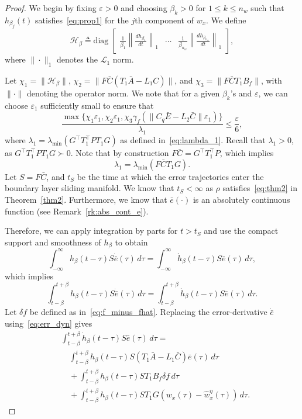 \documentclass[times, doublespace]{rncauth}
\newcommand{\intinf}{\int_{-\infty}^{\infty}}
\newcommand{\intinfb}{\int_{t-\beta}^{t+\beta}}
\begin{document}
\begin{proof}
	We begin by fixing $\varepsilon>0$ and choosing $\beta_k>0$ for $1\le k\le n_w$ such that $h_{\beta_j}(t)$ satisfies~\eqref{eq:prop1} for the $j$th component of $w_x$. We define
	\begin{equation}\label{eq:pf2d}
	\mathcal H_\beta \triangleq \mathrm{diag}\;\begin{bmatrix}
	\frac{1}{\beta_1}\left\|\frac{dh_{\beta_1}}{dt}\right\|_1 & \cdots & \frac{1}{\beta_{n_w}}\left\|\frac{dh_{\beta_{n_w}}}{dt}\right\|_1
	\end{bmatrix},
	\end{equation}
	where $\|\cdot\|_1$ denotes the $\mathcal L_1$ norm.
	
	Let $\chi_1 = \|\mathcal H_\beta\|$, $\chi_2 = \|F\bar C(T_1 \bar A-L_1 C)\|$, and $\chi_3 = \|F\bar CT_1 B_f\|$, with $\|\cdot\|$ denoting the operator norm. We note that for a given $\beta_k$'s and $\varepsilon$, we can choose $\varepsilon_1$ sufficiently small to ensure that
	\begin{equation}\label{eq:chi}
	\frac{\max\{\chi_1 \varepsilon_1, \chi_2 \varepsilon_1, \chi_3 \gamma_f(\|C_q\bar E-L_2\bar C\|\varepsilon_1)\}}{\lambda_1} \le \frac{\varepsilon}{6},
	\end{equation}
	where $
	\lambda_1 = \lambda_{\min}(G^\top T_1^\top P T_1 G)$
	as defined in~\eqref{eq:lambda_1}. Recall that $\lambda_1>0$, as $G^\top T_1^\top P T_1 G\succ 0$. Note that by construction $F\bar C = G^\top T_1^\top P$, which implies
	\begin{equation}\label{eq:lam_1_later}
	\lambda_1 = \lambda_{\min}(F\bar CT_1 G).
	\end{equation}
	Let $S=F\bar C$, and $t_S$ be the time at which the error trajectories enter the boundary layer sliding manifold. We know that $t_S<\infty$ as $\rho$ satisfies~\eqref{eq:thm2} in Theorem~\ref{thm2}. Furthermore, we know that $\bar e(\cdot)$ is an absolutely continuous function (see Remark~\ref{rk:abs_cont_e}). 
	
	Therefore, we can apply integration by parts for $t>t_S$ and use the compact support and smoothness of $h_\beta$ to obtain
	\[
	\intinf h_\beta(t-\tau)S\dot{\bar{e}}(\tau)\, d\tau = \intinf \dot h_\beta(t-\tau)S\bar e(\tau)\, d\tau,
	\]
	which implies
	\[
	\intinfb h_\beta(t-\tau)S\dot{\bar{e}}(\tau)\, d\tau = \intinfb \dot h_\beta(t-\tau)S\bar e(\tau)\, d\tau.
	\]
	Let $\delta f$ be defined as in~\eqref{eq:f_minus_fhat}. Replacing the error-derivative $\dot{\bar e}$ using~\eqref{eq:err_dyn} gives
	\begin{align}
	\nonumber& \intinfb \dot h_\beta(t-\tau)S\bar e(\tau)\, d\tau =\\
	\nonumber& \quad \intinfb h_\beta(t-\tau) S(T_1 \bar A -L_1\bar C)\bar e(\tau)\,d\tau \\
	\nonumber&\quad + \intinfb h_\beta(t-\tau)ST_1 B_f\delta f\,d\tau\\
	&\quad + \intinfb h_\beta(t-\tau) ST_1 G \left(w_x(\tau)-\hat w^\eta_x(\tau)\right)\, d\tau.\label{eq:pf2e}
	\end{align}
	

\end{proof}
\end{document}
